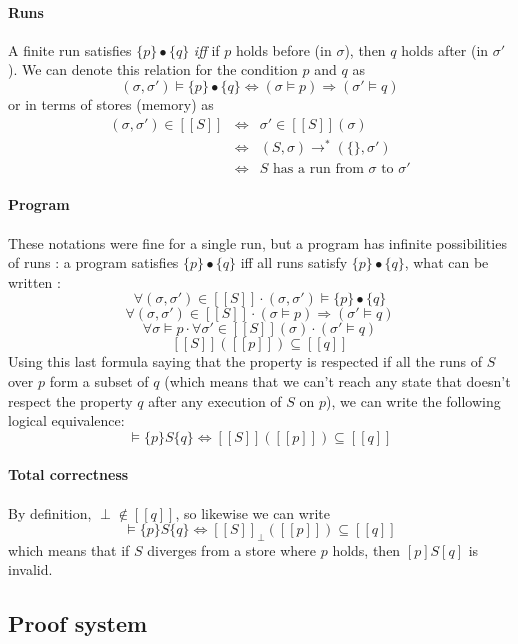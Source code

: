 \documentclass[12pt, a4paper]{book}
\begin{document}
\paragraph{Runs} A finite run satisfies $\{p\}\bullet\{q\}$ \textit{iff} if $p$
holds before (in $\sigma$), then $q$ holds after (in $\sigma'$). We can denote
this relation for the condition $p$ and $q$ as
$$
(\sigma, \sigma') \vDash \{p\}\bullet\{q\} \iff (\sigma\vDash p) \Rightarrow
(\sigma' \vDash q)
$$
or in terms of stores (memory) as
\begin{eqnarray*}
    (\sigma,\sigma') \in [[S]] & \iff & \sigma' \in [[S]](\sigma) \\
    & \iff & (S,\sigma) \longrightarrow^{*} (\{\}, \sigma') \\
    & \iff & S \textrm{ has a run from } \sigma \textrm{ to } \sigma'
\end{eqnarray*}

\paragraph{Program} These notations were fine for a single run, but a program
has infinite possibilities of runs : a program satisfies $\{p\}\bullet\{q\}$ iff
all runs satisfy $\{p\}\bullet\{q\}$, what can be written :
$$
\forall (\sigma,\sigma') \in [[S]] \cdot (\sigma,\sigma') \vDash \{p\}\bullet\{q\}
$$
$$
\forall(\sigma,\sigma') \in [[S]] \cdot (\sigma \vDash p) \Rightarrow (\sigma'\vDash q)
$$
$$
\forall\sigma \vDash p \cdot \forall\sigma'\in[[S]](\sigma)\cdot(\sigma'\vDash q)
$$
$$
[[S]]([[p]]) \subseteq [[q]]
$$
Using this last formula saying that the property is respected if all the runs of
$S$ over $p$ form a subset of $q$ (which means that we can't reach any state
that doesn't respect the property $q$ after any execution of $S$ on $p$), we
can write the following logical equivalence:
$$
\vDash \{p\} S \{q\} \iff [[S]]([[p]]) \subseteq [[q]]
$$

\paragraph{Total correctness} By definition, $\perp \not\in [[q]]$, so likewise
we can write
$$
\vDash \{p\} S \{q\} \iff {[[S]]}_{\perp}([[p]]) \subseteq [[q]]
$$
which means that if $S$ diverges from a store where $p$ holds, then $[p] S [q]$
is invalid.

\subsection{Proof system}
\label{sub:Proof system}
\end{document}
